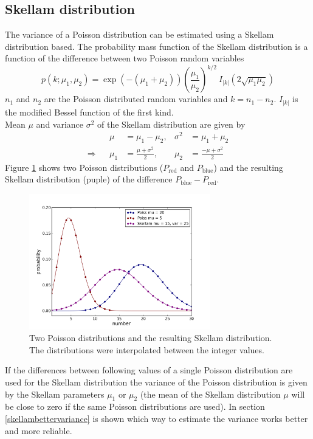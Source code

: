 \subsection{Skellam distribution}\label{skellamdist}
The variance of a Poisson distribution can be estimated using a Skellam distribution based.
The probability
mass function of the Skellam distribution is a function of the difference between
two Poisson random variables
\begin{equation}
	p(k;\mu_1, \mu_2) =
	\exp(-(\mu_1+\mu_2))\left(\frac{\mu_1}{\mu_2}\right)^{k/2}~I_{|k|}\left(2\sqrt{\mu_1
	\mu_2}\right)
\end{equation}  
$n_1$ and $n_2$ are the Poisson distributed random variables and $k = n_1 - n_2$.
$I_{|k|}$ is the modified Bessel function of the first kind.\\
Mean $\mu$ and variance $\sigma^2$ of the Skellam distribution are given by
\begin{align}
	&&\mu &= \mu_1 - \mu_2,& \sigma^2 &= \mu_1 + \mu_2\\
	\Rightarrow &&\mu_1& = \frac{\mu + \sigma^2}{2},& \mu_2 &=\frac{-\mu +
	\sigma^2}{2}
\end{align}
Figure \ref{skellamdistfig} shows two Poisson distributions ($P_\text{red}$ and $P_\text{blue}$) and the resulting Skellam distribution (puple) of the difference $P_\text{blue} - P_\text{red}$.
\begin{figure}
\centering
\includegraphics[width = 0.7\textwidth]{pictures/skellamdist.png}
	\caption{Two Poisson distributions and the resulting Skellam distribution. The distributions were interpolated between the integer values.}
	\label{skellamdistfig}
\end{figure}
If the differences between following values of a single Poisson distribution are used for the Skellam distribution the variance of the Poisson distribution is given by the Skellam parameters $\mu_1$ or $\mu_2$ (the mean of the Skellam distribution $\mu$ will be close to zero if the same Poisson distributions are used).\newline
In section \ref{skellambettervariance} is shown which way to estimate the variance works better and more reliable.



